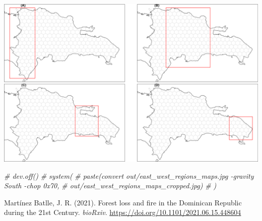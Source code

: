 \documentclass[10pt,landscape,a3paper]{article}
\newlength{\cslhangindent}
\newenvironment{CSLReferences}%
{\setlength{\parindent}{0pt}%
\everypar{\setlength{\hangindent}{\cslhangindent}}\ignorespaces}%
{\par}
\newenvironment{Shaded}{\begin{snugshade}}{\end{snugshade}}
\newcommand{\CommentTok}[1]{\textcolor[rgb]{0.56,0.35,0.01}{\textit{#1}}}
\begin{document}
\begin{center}\includegraphics{img/modelling/aa-local-models-1} \end{center}

\begin{Shaded}
\begin{Highlighting}[]
\CommentTok{\# dev.off()}
\CommentTok{\# system(}
\CommentTok{\#   paste(\textquotesingle{}convert out/east\_west\_regions\_maps.jpg {-}gravity South {-}chop 0x70\textquotesingle{},}
\CommentTok{\#          \textquotesingle{}out/east\_west\_regions\_maps\_cropped.jpg\textquotesingle{})}
\CommentTok{\# )}
\end{Highlighting}
\end{Shaded}

\hypertarget{refs}{}
\begin{CSLReferences}{1}{0}
\leavevmode\hypertarget{ref-martinez2021forest}{}%
Martínez Batlle, J. R. (2021). {Forest loss and fire in the Dominican
Republic during the 21st Century}. \emph{bioRxiv}.
\url{https://doi.org/10.1101/2021.06.15.448604}

\end{CSLReferences}




\newpage
\singlespacing 
\end{document}
